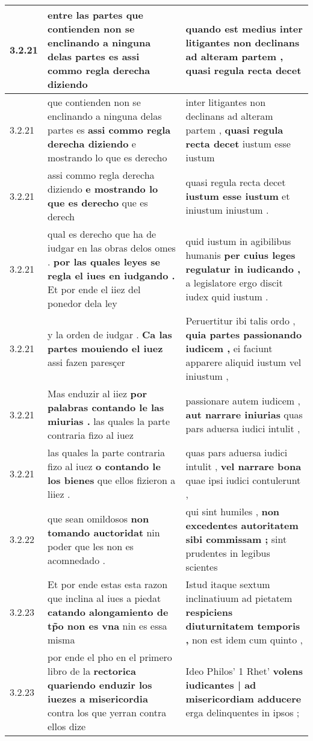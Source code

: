\begin{tabular}{|p{1cm}|p{6.5cm}|p{6.5cm}|}
3.2.21 & entre las partes \textbf{ que contienden non se enclinando a ninguna delas partes es } assi commo regla derecha diziendo & quando est medius \textbf{ inter litigantes non declinans ad alteram partem , } quasi regula recta decet \\\hline
3.2.21 & que contienden non se enclinando a ninguna delas partes es \textbf{ assi commo regla derecha diziendo } e mostrando lo que es derecho & inter litigantes non declinans ad alteram partem , \textbf{ quasi regula recta decet } iustum esse iustum \\\hline
3.2.21 & assi commo regla derecha diziendo \textbf{ e mostrando lo que es derecho } que es derech & quasi regula recta decet \textbf{ iustum esse iustum } et iniustum iniustum . \\\hline
3.2.21 & qual es derecho que ha de iudgar en las obras delos omes . \textbf{ por las quales leyes se regla el iues en iudgando . } Et por ende el iiez del ponedor dela ley & quid iustum in agibilibus humanis \textbf{ per cuius leges regulatur in iudicando , } a legislatore ergo discit iudex quid iustum . \\\hline
3.2.21 & y la orden de iudgar . \textbf{ Ca las partes mouiendo el iuez } assi fazen paresçer & Peruertitur ibi talis ordo , \textbf{ quia partes passionando iudicem , } ei faciunt apparere aliquid iustum vel iniustum , \\\hline
3.2.21 & Mas enduzir al iiez \textbf{ por palabras contando le las miurias . } las quales la parte contraria fizo al iuez & passionare autem iudicem , \textbf{ aut narrare iniurias } quas pars aduersa iudici intulit , \\\hline
3.2.21 & las quales la parte contraria fizo al iuez \textbf{ o contando le los bienes } que ellos fizieron a liiez . & quas pars aduersa iudici intulit , \textbf{ vel narrare bona } quae ipsi iudici contulerunt , \\\hline
3.2.22 & que sean omildosos \textbf{ non tomando auctoridat } nin poder que les non es acomnedado . & qui sint humiles , \textbf{ non excedentes autoritatem sibi commissam ; } sint prudentes in legibus scientes \\\hline
3.2.23 & Et por ende estas esta razon que inclina al iues a piedat \textbf{ catando alongamiento de tp̃o non es vna } nin es essa misma & Istud itaque sextum inclinatiuum ad pietatem \textbf{ respiciens diuturnitatem temporis , } non est idem cum quinto , \\\hline
3.2.23 & por ende el pho en el primero libro de la \textbf{ rectorica quariendo enduzir los iuezes a misericordia } contra los que yerran contra ellos dize & Ideo Philos’ 1 Rhet’ \textbf{ volens iudicantes | ad misericordiam adducere } erga delinquentes in ipsos ; \\\hline

\end{tabular}
